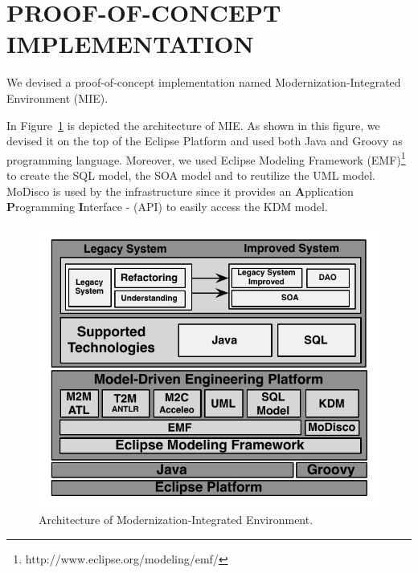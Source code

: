 \documentclass[a4paper,twoside]{article}
\begin{document}
\section{\uppercase{Proof-of-concept implementation}}\label{sec:proof_of_concept_implementation}

We devised a proof-of-concept implementation named Modernization-Integrated Environment (MIE). 


In Figure~\ref{fig:architecture} is depicted the architecture of MIE. As shown in this figure, we devised it on the top of the Eclipse Platform and used both Java and Groovy as programming language. Moreover, we used Eclipse Modeling Framework (EMF)\footnote{http://www.eclipse.org/modeling/emf/} to create the SQL model, the SOA model and to reutilize the UML model. MoDisco is used by the infrastructure since it provides an
\textbf{A}pplication \textbf{P}rogramming \textbf{I}nterface - (API) to easily access the KDM model. 

\begin{figure}[!h]
\centering
 \includegraphics[scale=0.6]{Figuras/Arquitetura_da_Ferramenta}
\caption{Architecture of Modernization-Integrated Environment.}
\label{fig:architecture}
\end{figure}
\end{document}
